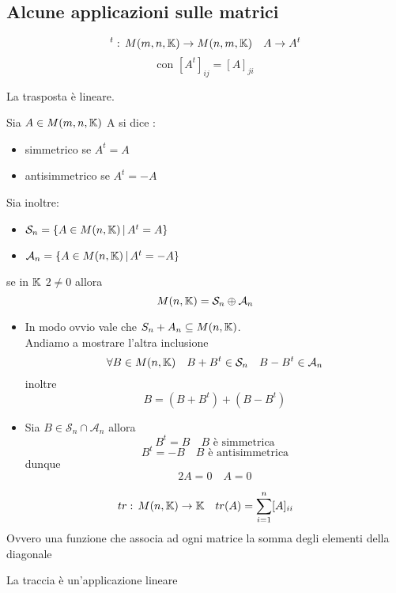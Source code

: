 \subsection{Alcune applicazioni sulle matrici}
\begin{defn}[Trasposta] $$ {}^t:\, M(m,n,\mathbb{K}) \to M(n,m,\mathbb{K}) \quad A \to A^t$$
 $$\text{con } [A^t]_{ij}=[A]_{ji}$$
\end{defn}
\begin{prop}La trasposta è lineare.
\end{prop} 
\begin{defn}Sia $A \in M(m,n,\mathbb{K})$ A si dice :
\begin{itemize}
\item simmetrico se $A^t = A$
\item antisimmetrico se $A^t=-A$
\end{itemize}
Sia inoltre:
\begin{itemize}
\item $\mathcal{S}_n=\{ A \in M(n,\mathbb{K})\, | \, A^t=A\}$ 
\item $\mathcal{A}_n=\{ A \in M(n,\mathbb{K})\, | \, A^t=-A\}$
\end{itemize}
\end{defn}
\begin{prop} se in $ \mathbb{K} $ $ 2 \neq 0 $ allora 
$$ M(n,\mathbb{K})= \mathcal{S}_n \oplus \mathcal{A}_n$$

\proof \bbianco
\begin{itemize}
	\item In modo ovvio vale che $S_n + A_n \subseteq M(n,\mathbb{K})$.\\
	Andiamo a mostrare l'altra inclusione 
	$$ \forall B \in M(n,\mathbb{K}) \quad B+B^t \in \mathcal{S}_n \quad B-B^t \in \mathcal{A}_n $$
	inoltre
	$$ B = (B+B^t) + (B-B^t)$$
	\item Sia $B \in \mathcal{S}_n \cap \mathcal{A}_n$ allora
	$$ B^t=B \quad B\text{ \`e simmetrica}$$
	$$ B^t =-B \quad B \text{ \`e antisimmetrica}$$
	dunque 
	$$2A=0\quad A=0 $$
\end{itemize}
\endproof
\end{prop}
\spazio
\begin{defn}[Traccia]
$$ tr: \, M (n,\mathbb{K}) \to \mathbb{K} \quad tr( A) = \sum_{i=1}^ n [A]_{ii}$$
Ovvero una funzione che associa ad ogni matrice la somma degli elementi della diagonale
\end{defn}
\begin{prop} La traccia \`e un'applicazione lineare
\end{prop}
\newpage
